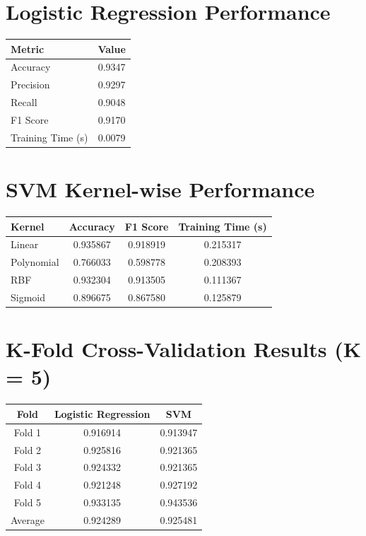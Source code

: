\documentclass[11pt]{article}
\begin{document}
\section*{Logistic Regression Performance}
\begin{table}[H]
\centering
\renewcommand{\arraystretch}{1.3}
\begin{tabular}{|l|c|}
\hline
Metric & Value \\ \hline
Accuracy & 0.9347 \\
Precision & 0.9297 \\
Recall & 0.9048 \\
F1 Score & 0.9170 \\
Training Time (s) & 0.0079 \\ \hline
\end{tabular}
\end{table}

\section*{SVM Kernel-wise Performance}
\begin{table}[h!]
\centering
\renewcommand{\arraystretch}{1.3}
\begin{tabular}{|l|c|c|c|}
\hline
Kernel & Accuracy & F1 Score & Training Time (s) \\ \hline
Linear & 0.935867 & 0.918919 & 0.215317 \\
Polynomial & 0.766033 & 0.598778 & 0.208393 \\
RBF & 0.932304 & 0.913505 & 0.111367 \\
Sigmoid & 0.896675 & 0.867580 & 0.125879 \\ \hline
\end{tabular}
\end{table}

\section*{K-Fold Cross-Validation Results (K = 5)}
\begin{table}[h!]
\centering
\renewcommand{\arraystretch}{1.3}
\begin{tabular}{|c|c|c|}
\hline
Fold & Logistic Regression & SVM \\ \hline
Fold 1 & 0.916914 & 0.913947 \\
Fold 2 & 0.925816 & 0.921365 \\
Fold 3 & 0.924332 & 0.921365 \\
Fold 4 & 0.921248 & 0.927192 \\
Fold 5 & 0.933135 & 0.943536 \\ \hline
Average & 0.924289 & 0.925481 \\ \hline
\end{tabular}
\end{table}
\end{document}
